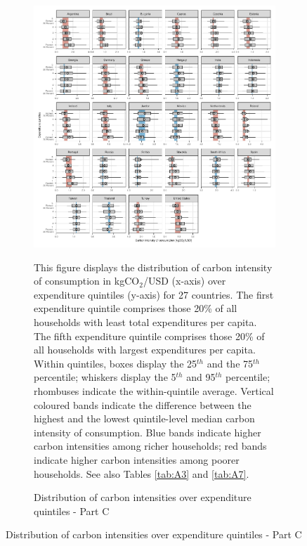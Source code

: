 \clearpage

\begin{figure}[ht!]\ContinuedFloat
   \begin{subfigure}[b]{\textwidth}
  \centering
    \caption{Distribution of carbon intensities over expenditure quintiles - Part C} \label{fig:Quint_C}
  \includegraphics{1_Figures/Figures_Appendix/Figure_1_2017_Appendix_3}
  \begin{subcaption2}
    This figure displays the distribution of carbon intensity of consumption in kgCO$_{2}$/USD (x-axis) over expenditure quintiles (y-axis) for 27 countries. The first expenditure quintile comprises those 20\% of all households with least total expenditures per capita. The fifth expenditure quintile comprises those 20\% of all households with largest expenditures per capita. Within quintiles, boxes display the 25$^{th}$ and the 75$^{th}$ percentile; whiskers display the 5$^{th}$ and 95$^{th}$ percentile; rhombuses indicate the within-quintile average. Vertical coloured bands indicate the difference between the highest and the lowest quintile-level median carbon intensity of consumption. Blue bands indicate higher carbon intensities among richer households; red bands indicate higher carbon intensities among poorer households. See also Tables \ref{tab:A3} and \ref{tab:A7}.
  \end{subcaption2}
\end{subfigure}
\end{figure}